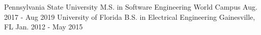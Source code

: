 

\begin{cventries}

  \cventry
    {Pennsylvania State University} %
    {M.S. in Software Engineering} %
    {World Campus} %
    {Aug. 2017 - Aug 2019} %
    {
    }
  \cventry
    {University of Florida} %
    {B.S. in Electrical Engineering} %
    {Gainesville, FL} %
    {Jan. 2012 - May 2015} %
		{}
\end{cventries}
